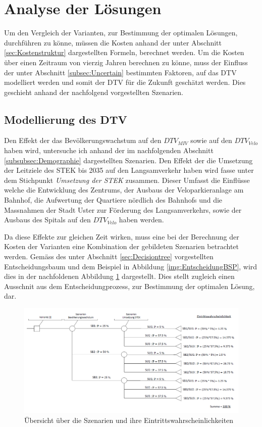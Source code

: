 
\section{Analyse der Lösungen}
\label{sec:Analyse}

Um den Vergleich der Varianten, zur Bestimmung der optimalen Lösungen, durchführen zu könne, müssen die Kosten anhand der unter Abschnitt \ref{sec:Kostenstruktur} dargestellten Formeln, berechnet werden. Um die Kosten über einen Zeitraum von vierzig Jahren berechnen zu könne, muss der Einfluss der unter Abschnitt \ref{subsec:Uncertain} bestimmten Faktoren, auf das DTV modelliert werden und somit der DTV für die Zukunft geschätzt werden. Dies geschieht anhand der nachfolgend vorgestellten Szenarien.


	\subsection{Modellierung des DTV}
	\label{subsec:Modellierung}
	
Den Effekt der das Bevölkerungswachstum auf den $DTV_{MIV}$ sowie auf den $DTV_{Velo}$ haben wird, untersuche ich anhand der im nachfolgenden Abschnitt \ref{subsubsec:Demographie} dargestellten Szenarien. Den Effekt der die Umsetzung der Leitziele des STEK bis 2035 auf den Langsamverkehr haben wird fasse unter dem Stichpunkt \textit{Umsetzung der STEK} zusammen. Dieser Umfasst die Einflüsse welche die Entwicklung des Zentrums, der Ausbaus der Veloparkieranlage am Bahnhof, die Aufwertung der Quartiere nördlich des Bahnhofs und die Massnahmen der Stadt Uster zur Förderung des Langsamverkehrs, sowie der Ausbaus des Spitals auf den $DTV_{Velo}$ haben werden.

Da diese Effekte zur gleichen Zeit wirken, muss eine bei der Berechnung der Kosten der Varianten eine Kombination der gebildeten Szenarien betrachtet werden. Gemäss des unter Abschnitt \ref{sec:Decisiontree} vorgestellten Entscheidungsbaum und dem Beispiel in Abbildung \ref{img:EntscheidungBSP}, wird dies in der nachfoldenen Abbildung \ref{img:EntscheidunSzenarien} dargestellt. Dies stellt zugleich einen Ausschnit aus dem Entscheidungprozess, zur Bestimmung der optimalen Lösung, dar.

\begin{figure}[h!]
	\centering
	\includegraphics[width=\textwidth]{figures/04-06-01-Entscheidungsbaum-Szenarien}
	\caption[Szenarienübersicht]{Übersicht über die Szenarien und ihre Eintrittswahrscheinlichkeiten}
	\label{img:EntscheidunSzenarien}
\end{figure}

